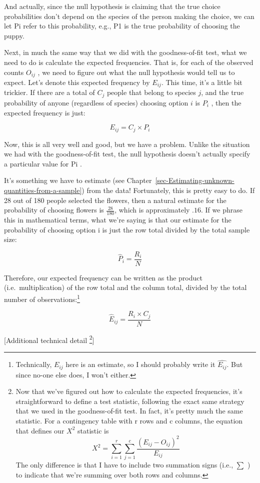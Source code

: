 \documentclass[
  a4paper,
]{book}
\begin{document}
And actually, since the null hypothesis is claiming that the true choice
probabilities don't depend on the species of the person making the
choice, we can let Pi refer to this probability, e.g., P1 is the true
probability of choosing the puppy.

Next, in much the same way that we did with the goodness-of-fit test,
what we need to do is calculate the expected frequencies. That is, for
each of the observed counts \(O_{ij}\) , we need to figure out what the
null hypothesis would tell us to expect. Let's denote this expected
frequency by \(E_{ij}\). This time, it's a little bit trickier. If there
are a total of \(C_j\) people that belong to species \(j\), and the true
probability of anyone (regardless of species) choosing option \(i\) is
\(P_i\) , then the expected frequency is just:

\[E_{ij}=C_j \times P_i\]

Now, this is all very well and good, but we have a problem. Unlike the
situation we had with the goodness-of-fit test, the null hypothesis
doesn't actually specify a particular value for Pi .

It's something we have to estimate (see
Chapter~\ref{sec-Estimating-unknown-quantities-from-a-sample}) from the
data! Fortunately, this is pretty easy to do. If 28 out of 180 people
selected the flowers, then a natural estimate for the probability of
choosing flowers is \(\frac{28}{180}\), which is approximately \(.16\).
If we phrase this in mathematical terms, what we're saying is that our
estimate for the probability of choosing option i is just the row total
divided by the total sample size:

\[\hat{P}_{i}= \frac{R_i}{N}\]

Therefore, our expected frequency can be written as the product
(i.e.~multiplication) of the row total and the column total, divided by
the total number of observations:\footnote{Technically, \(E_{ij}\) here
  is an estimate, so I should probably write it \(\hat{E_{ij}}\). But
  since no-one else does, I won't either.}

\[\hat{E}_{ij}= \frac{R_i \times C_j}{N}\]

{[}Additional technical detail \footnote{Now that we've figured out how
  to calculate the expected frequencies, it's straightforward to define
  a test statistic, following the exact same strategy that we used in
  the goodness-of-fit test. In fact, it's pretty much the same
  statistic. For a contingency table with r rows and c columns, the
  equation that defines our \(X^2\) statistic is
  \[X^2=\sum_{i=1}^{r}\sum_{j=1}^{c} \frac{(E_{ij}-O_{ij})^2}{E_{ij}}\]
  The only difference is that I have to include two summation signs
  (i.e., \(\sum\) ) to indicate that we're summing over both rows and
  columns.}{]}
\end{document}
